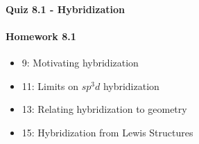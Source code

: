 \documentclass[12pt, openany, letterpaper]{memoir}
\begin{document}
\paragraph*{Quiz 8.1 - Hybridization}
\paragraph*{Homework 8.1}
\begin{itemize}
  \item 9: Motivating hybridization
  \item 11: Limits on $sp^3d$ hybridization
  \item 13: Relating hybridization to geometry
  \item 15: Hybridization from Lewis Structures
\end{itemize}
\end{document}
